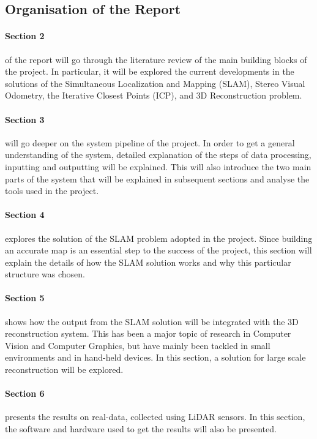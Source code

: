 \documentclass[12pt]{article}
\begin{document}
	\subsection{ Organisation of the Report}

\paragraph{Section 2} of the report will go through the literature review of the main building blocks of the project. In particular, it will be explored the current developments in the solutions of the Simultaneous Localization and Mapping (SLAM), Stereo Visual Odometry, the Iterative Closest Points (ICP), and 3D Reconstruction problem.
	
\paragraph{Section 3} will go deeper on the system pipeline of the project. In order to get a general understanding of the system, detailed explanation of the steps of data processing, inputting and outputting will be explained. This will also introduce the two main parts of the system that will be explained in subsequent sections and analyse the tools used in the project.
		
\paragraph{Section 4} explores the solution of the SLAM problem adopted in the project. Since building an accurate map is an essential step to the success of the project, this section will explain the details of how the SLAM solution works and why this particular structure was chosen.
		
\paragraph{Section 5} shows how the output from the SLAM solution will be integrated with the 3D reconstruction system. This has been a major topic of research in Computer Vision and Computer Graphics, but have mainly been tackled in small environments and in hand-held devices. In this section, a solution for large scale reconstruction will be explored.
		
\paragraph{Section 6} presents the results on real-data, collected using LiDAR sensors. In this section, the software and hardware used to get the results will also be presented.
		
\end{document}
